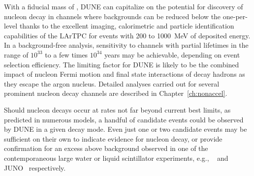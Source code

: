 With a fiducial mass of \fdfiducialmass{}, DUNE can capitalize on the 
potential for discovery of nucleon decay in channels where backgrounds 
can be reduced below the one-per-\si{\Mtyr} level thanks to the 
excellent imaging, calorimetric and particle identification capabilities 
of the LArTPC for events with 200 to \SI{1000}{\MeV} of deposited energy.  
In a background-free analysis, sensitivity to channels with partial lifetimes 
in the range of $10^{33}$ to a few times $10^{34}$ \si{years} may be achievable, 
depending on event selection efficiency.  The limiting factor for DUNE 
is likely to be the combined impact of nucleon Fermi motion and final state 
interactions of decay hadrons as they escape the argon nucleus.  Detailed 
analyses carried out for several prominent nucleon decay channels are 
described in Chapter~\ref{ch:nonaccel}.

Should nucleon decays occur at rates not far beyond current best limits, 
as predicted in numerous  models, a handful of candidate 
events could be observed by DUNE in a given decay mode.  
Even just one or two candidate events may be 
sufficient on their own to indicate evidence for nucleon decay, 
or provide confirmation 
for an excess above background observed in one of the contemporaneous 
large water or liquid scintillator experiments, e.g., ~\cite{Abe:2018uyc}
and JUNO~\cite{Djurcic:2015vqa,An:2015jdp} respectively.
